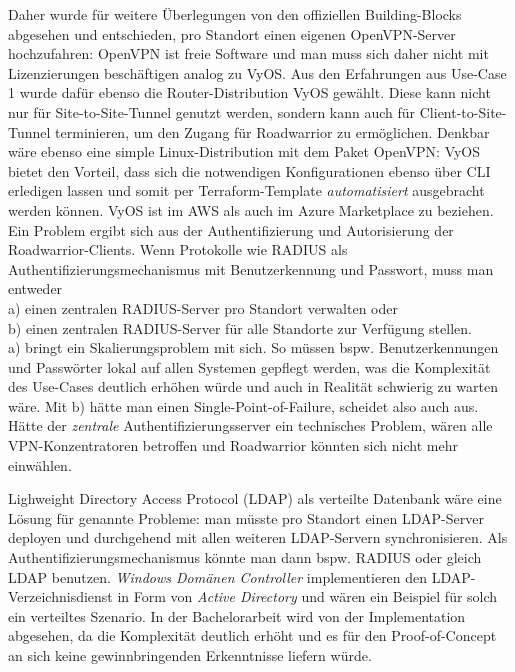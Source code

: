 Daher wurde für weitere Überlegungen von den offiziellen Building-Blocks abgesehen und entschieden, pro Standort einen eigenen OpenVPN-Server hochzufahren:
OpenVPN ist freie Software und man muss sich daher nicht mit Lizenzierungen beschäftigen analog zu VyOS.
Aus den Erfahrungen aus Use-Case 1 wurde dafür ebenso die Router-Distribution VyOS gewählt. Diese kann nicht nur für Site-to-Site-Tunnel genutzt werden, sondern kann auch für Client-to-Site-Tunnel terminieren, um den Zugang für Roadwarrior zu ermöglichen. Denkbar wäre ebenso eine simple Linux-Distribution mit dem Paket OpenVPN: VyOS bietet den Vorteil, dass sich die notwendigen Konfigurationen ebenso über CLI erledigen lassen und somit per Terraform-Template \textit{automatisiert} ausgebracht werden können. VyOS ist im AWS als auch im Azure Marketplace zu beziehen.
Ein Problem ergibt sich aus der Authentifizierung und Autorisierung der Roadwarrior-Clients. Wenn Protokolle wie RADIUS als Authentifizierungsmechanismus mit Benutzerkennung und Passwort, muss man entweder\\
a) einen zentralen RADIUS-Server pro Standort verwalten oder \\
b) einen zentralen RADIUS-Server für alle Standorte zur Verfügung stellen.\\

a) bringt ein Skalierungsproblem mit sich. So müssen bspw. Benutzerkennungen und Passwörter lokal auf allen Systemen gepflegt werden, was die Komplexität des Use-Cases deutlich erhöhen würde und auch in Realität schwierig zu warten wäre. Mit b) hätte man einen Single-Point-of-Failure, scheidet also auch aus. Hätte der \textit{zentrale} Authentifizierungsserver ein technisches Problem, wären alle VPN-Konzentratoren betroffen und Roadwarrior könnten sich nicht mehr einwählen.

Lighweight Directory Access Protocol (LDAP) als verteilte Datenbank wäre eine Lösung für genannte Probleme: man müsste pro Standort einen LDAP-Server deployen und durchgehend mit allen weiteren LDAP-Servern synchronisieren. Als Authentifizierungsmechanismus könnte man dann bspw. RADIUS oder gleich LDAP benutzen. \textit{Windows Domänen Controller} implementieren den LDAP-Verzeichnisdienst in Form von \textit{Active Directory} und wären ein Beispiel für solch ein verteiltes Szenario.\cite[S.603-604]{Tanenbaum2003} In der Bachelorarbeit wird von der Implementation abgesehen, da die Komplexität deutlich erhöht und es für den Proof-of-Concept an sich keine gewinnbringenden Erkenntnisse liefern würde.

